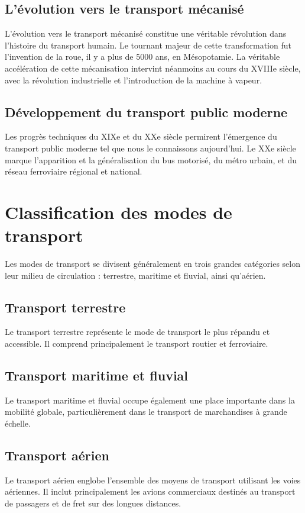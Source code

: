 \documentclass[a4paper, 12pt]{book}
\begin{document}
\subsection{L'évolution vers le transport mécanisé}
L'évolution vers le transport mécanisé constitue une véritable révolution dans l'histoire du transport humain. Le tournant majeur de cette transformation fut l'invention de la roue, il y a plus de 5000 ans, en Mésopotamie. La véritable accélération de cette mécanisation intervint néanmoins au cours du XVIIIe siècle, avec la révolution industrielle et l'introduction de la machine à vapeur.

\subsection{Développement du transport public moderne}
Les progrès techniques du XIXe et du XXe siècle permirent l'émergence du transport public moderne tel que nous le connaissons aujourd'hui. Le XXe siècle marque l'apparition et la généralisation du bus motorisé, du métro urbain, et du réseau ferroviaire régional et national.

\section{Classification des modes de transport}

Les modes de transport se divisent généralement en trois grandes catégories selon leur milieu de circulation : terrestre, maritime et fluvial, ainsi qu'aérien.

\subsection{Transport terrestre}
Le transport terrestre représente le mode de transport le plus répandu et accessible. Il comprend principalement le transport routier et ferroviaire.

\subsection{Transport maritime et fluvial}
Le transport maritime et fluvial occupe également une place importante dans la mobilité globale, particulièrement dans le transport de marchandises à grande échelle.

\subsection{Transport aérien}
Le transport aérien englobe l'ensemble des moyens de transport utilisant les voies aériennes. Il inclut principalement les avions commerciaux destinés au transport de passagers et de fret sur des longues distances.
\end{document}
